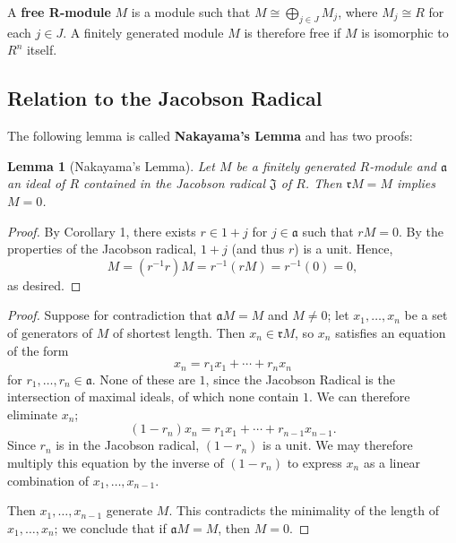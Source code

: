 \documentclass[11pt]{article}
\newtheorem{lemma}{Lemma}
\begin{document}
A \textbf{free R-module} $M$ is a module such that $M \cong \bigoplus_{j \in J} M_{j}$, where $M_{j} \cong R$ for each $j \in J$. A finitely generated module $M$ is therefore free if $M$ is isomorphic to $R^{n}$ itself. 
\subsection{Relation to the Jacobson Radical}


The following lemma is called \textbf{Nakayama's Lemma} and has two proofs:

\begin{adjustwidth}{1cm}{}
	\begin{lemma}[Nakayama's Lemma]
		Let $M$ be a finitely generated $R$-module and $\mathfrak{a}$ an ideal of $R$ contained in the Jacobson radical $\mathfrak{J}$ of $R$. Then $\mathfrak{r}M = M$ implies $M = 0$.
	\end{lemma}
	\begin{proof}
		By Corollary 1, there exists $r \in 1 + j$ for $j \in \mathfrak{a}$ such that $rM = 0$. By the properties of the Jacobson radical, $1 + j$ (and thus $r$) is a unit. Hence,
		\[
			M = (r^{-1}r)M = r^{-1}(rM) = r^{-1}(0) = 0,
		\]
		as desired.
	\end{proof}
	\begin{proof}
		Suppose for contradiction that $\mathfrak{a}M = M$ and $M \ne 0$; let $x_{1}, \ldots, x_{n}$ be a set of generators of $M$ of shortest length. Then $x_{n} \in \mathfrak{r}M$, so $x_{n}$ satisfies an equation of the form
		\[
			 x_{n} = r_{1} x_{1} + \cdots + r_{n} x_{n}
		\]
		for $r_{1}, \ldots, r_{n} \in \mathfrak{a}$. None of these are $1$, since the Jacobson Radical is the intersection of maximal ideals, of which none contain $1$. We can therefore eliminate $x_{n}$;
		\[
			(1 - r_{n})x_{n} = r_{1}x_{1} + \cdots + r_{n - 1}x_{n - 1}.
		\]
		Since $r_{n}$ is in the Jacobson radical, $(1 - r_{n})$ is a unit. We may therefore multiply this equation by the inverse of $(1 - r_{n})$ to express $x_{n}$ as a linear combination of $x_{1}, \ldots, x_{n - 1}$. 

		Then $x_{1}, \ldots, x_{n - 1}$ generate $M$. This contradicts the minimality of the length of $x_{1}, \ldots, x_{n}$; we conclude that if $\mathfrak{a} M = M$, then $M = 0$.
	\end{proof}
\end{adjustwidth}
\end{document}
